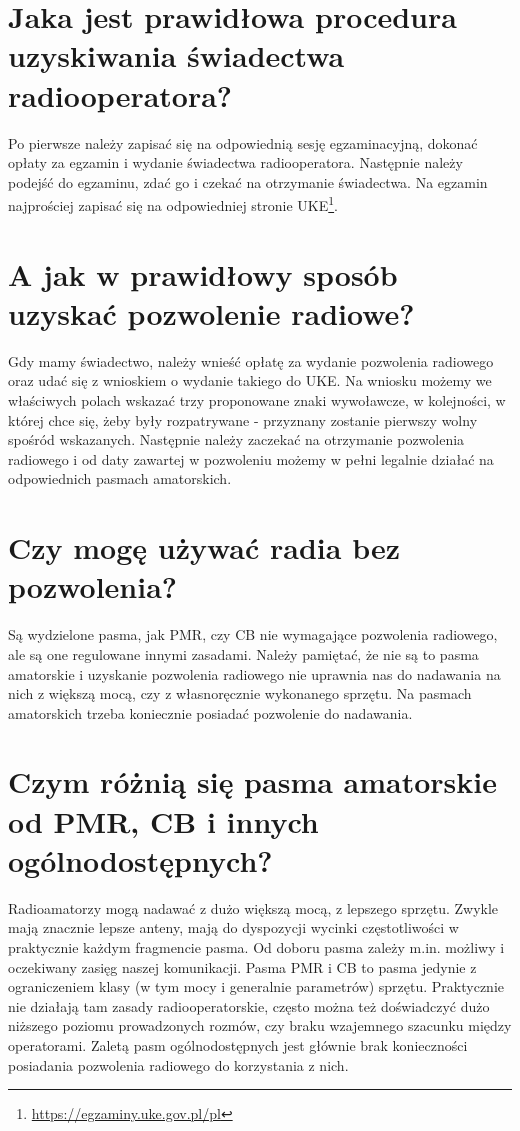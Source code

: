 \documentclass[a4paper,12pt]{article}
\begin{document}
\section{Jaka jest prawidłowa procedura uzyskiwania świadectwa radiooperatora?}
Po pierwsze należy zapisać się na odpowiednią sesję egzaminacyjną, dokonać opłaty za egzamin i wydanie świadectwa radiooperatora. Następnie należy podejść do egzaminu, zdać go i czekać na otrzymanie świadectwa. Na egzamin najprościej zapisać się na odpowiedniej stronie UKE\footnote{\url{https://egzaminy.uke.gov.pl/pl}}. 

\section{A jak w prawidłowy sposób uzyskać pozwolenie radiowe?}
Gdy mamy świadectwo, należy wnieść opłatę za wydanie pozwolenia radiowego oraz udać się z wnioskiem o wydanie takiego do UKE. Na wniosku możemy we właściwych polach wskazać trzy proponowane znaki wywoławcze, w kolejności, w której chce się, żeby były rozpatrywane - przyznany zostanie pierwszy wolny spośród wskazanych. Następnie należy zaczekać na otrzymanie pozwolenia radiowego i od daty zawartej w pozwoleniu możemy w pełni legalnie działać na odpowiednich pasmach amatorskich.

\section{Czy mogę używać radia bez pozwolenia?}
Są wydzielone pasma, jak PMR, czy CB nie wymagające pozwolenia radiowego, ale są one regulowane innymi zasadami. Należy pamiętać, że nie są to pasma amatorskie i uzyskanie pozwolenia radiowego nie uprawnia nas do nadawania na nich z większą mocą, czy z własnoręcznie wykonanego sprzętu. Na pasmach amatorskich trzeba koniecznie posiadać pozwolenie do nadawania.

\section{Czym różnią się pasma amatorskie od PMR, CB i innych ogólnodostępnych?}
Radioamatorzy mogą nadawać z dużo większą mocą, z lepszego sprzętu. Zwykle mają znacznie lepsze anteny, mają do dyspozycji wycinki częstotliwości w praktycznie każdym fragmencie pasma.
Od doboru pasma zależy m.in. możliwy i oczekiwany zasięg naszej komunikacji. Pasma PMR i CB to pasma jedynie z ograniczeniem klasy (w tym mocy i generalnie parametrów) sprzętu. Praktycznie nie działają tam zasady radiooperatorskie, często można też doświadczyć dużo niższego poziomu prowadzonych rozmów, czy braku wzajemnego szacunku między operatorami. Zaletą pasm ogólnodostępnych jest głównie brak konieczności posiadania pozwolenia radiowego do korzystania z nich.
\end{document}
